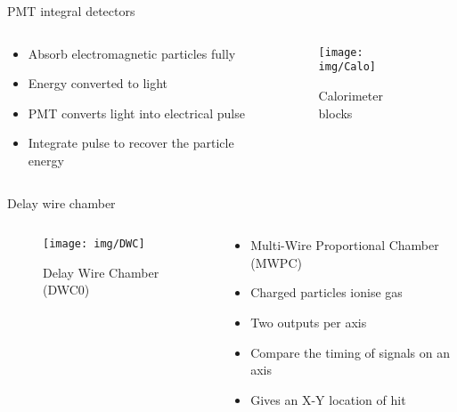 \documentclass[9pt]{beamer}
\begin{document}
\begin{frame}{PMT integral detectors}
  \begin{columns}
    \begin{column}{.4\textwidth}
      \begin{itemize}
        \item Absorb electromagnetic particles fully
        \item Energy converted to light
        \item PMT converts light into electrical pulse
        \item Integrate pulse to recover the particle energy
      \end{itemize}
    \end{column}
    \begin{column}{.6\textwidth}
    \vspace*{-0.5cm}
    \begin{figure}\texttt{[image: img/Calo]}\vspace*{-0.2cm}\caption{Calorimeter blocks}\end{figure}\vspace*{-1cm}
    \end{column}
  \end{columns}
\end{frame}

\begin{frame}{Delay wire chamber}
  \begin{columns}
    \begin{column}{.6\textwidth}
    \vspace*{-0.5cm}
    \begin{figure}\texttt{[image: img/DWC]}\vspace*{-0.2cm}\caption{Delay Wire Chamber (DWC0)}\end{figure}\vspace*{-1cm}
    \end{column}
    \begin{column}{.4\textwidth}
      \begin{itemize}
        \item Multi-Wire Proportional Chamber (MWPC)
        \item Charged particles ionise gas
        \item Two outputs per axis
        \item Compare the timing of signals on an axis
        \item Gives an X-Y location of hit
      \end{itemize}
    \end{column}
  \end{columns}
\end{frame}
\end{document}
